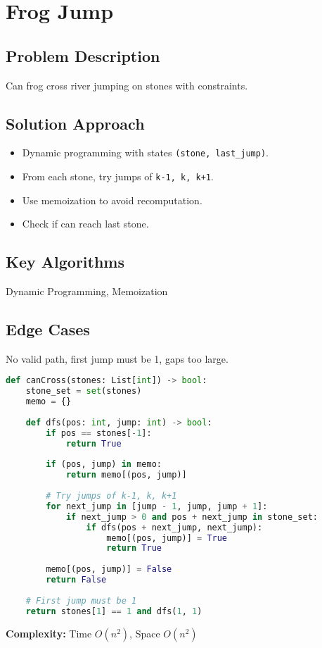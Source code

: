\documentclass[10pt, a4paper]{article}
\begin{document}
\section{Frog Jump}
\subsection*{Problem Description}
Can frog cross river jumping on stones with constraints.

\subsection*{Solution Approach}
\begin{itemize}
    \item Dynamic programming with states \texttt{(stone, last\_jump)}.
    \item From each stone, try jumps of \texttt{k-1, k, k+1}.
    \item Use memoization to avoid recomputation.
    \item Check if can reach last stone.
\end{itemize}

\subsection*{Key Algorithms}
Dynamic Programming, Memoization

\subsection*{Edge Cases}
No valid path, first jump must be 1, gaps too large.

\begin{lstlisting}[language=Python]
def canCross(stones: List[int]) -> bool:
    stone_set = set(stones)
    memo = {}
    
    def dfs(pos: int, jump: int) -> bool:
        if pos == stones[-1]:
            return True
        
        if (pos, jump) in memo:
            return memo[(pos, jump)]
        
        # Try jumps of k-1, k, k+1
        for next_jump in [jump - 1, jump, jump + 1]:
            if next_jump > 0 and pos + next_jump in stone_set:
                if dfs(pos + next_jump, next_jump):
                    memo[(pos, jump)] = True
                    return True
        
        memo[(pos, jump)] = False
        return False
    
    # First jump must be 1
    return stones[1] == 1 and dfs(1, 1)
\end{lstlisting}
\textbf{Complexity:} Time $O(n^2)$, Space $O(n^2)$
\end{document}
